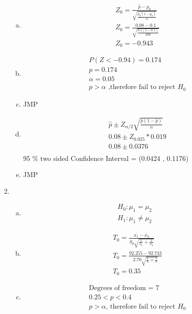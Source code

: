 \documentclass[14pt]{article}
\begin{document}
\begin{enumerate}
\begin{enumerate}[(a)]
\item
\begin{align*}
& Z_0 = \frac{\hat{p} - p_0}{\sqrt{\frac{p_0 (1 - p_0)}{n}}} \\[15pt]
& Z_0 = \frac{0.08 - 0.1}{\sqrt{\frac{0.1 (1 - 0.1)}{200}}} \\[15pt]
& Z_0 = -0.943
\end{align*}

\item
\begin{align*}
& P(Z < -0.94) = 0.174 \\[15pt]
& p = 0.174 \\[15pt]
& \alpha = 0.05 \\[15pt]
& p > \alpha \text{ ,therefore fail to reject } H_0
\end{align*}

\item
JMP

\item
\begin{align*}
& \hat{p} \pm Z_{\alpha / 2} \sqrt{\frac{\hat{p}(1-\hat{p})}{n}} \\[15pt]
& 0.08 \pm Z_{0.025} * 0.019 \\[15pt]
& 0.08 \pm 0.0376 \\[15pt]
\end{align*}
95 \% two sided Confidence Interval = (0.0424 , 0.1176)

\item
JMP

\end{enumerate}

\item
\begin{enumerate}[(a)]
\item
\begin{align*}
H_0: \mu_1 = \mu_2 \\[15pt]
H_1: \mu_1 \neq \mu_2
\end{align*}

\item
\begin{align*}
& T_0 = \frac{\bar{x_1} - \bar{x_2}}{S_p \sqrt{\frac{1}{n_1} + \frac{1}{n_2}}} \\[15pt]
& T_0 = \frac{92.255 - 92.733}{2.70 \sqrt{\frac{1}{8} + \frac{1}{8}}} \\[15pt]
& T_0 = 0.35
\end{align*}

\item
\begin{align*}
& \text{Degrees of freedom = } 7 \\[15pt]
& 0.25 < p < 0.4 \\[15pt]
& p > \alpha \text{, therefore fail to reject } H_0 
\end{align*}


\end{enumerate}
\end{enumerate}
\end{document}
